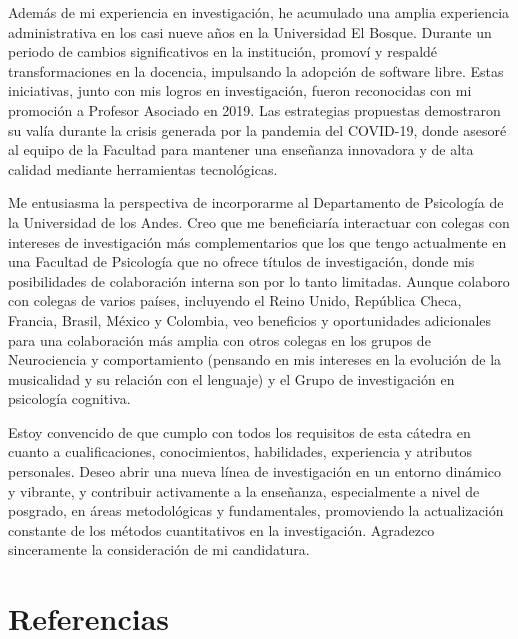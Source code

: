 \documentclass[11pt,a4paper,]{awesome-cv}
\begin{document}
\begin{small}
Además de mi experiencia en investigación, he acumulado una amplia experiencia administrativa en los casi nueve años en la Universidad El Bosque. Durante un periodo de cambios significativos en la institución, promoví y respaldé transformaciones en la docencia, impulsando la adopción de software libre. Estas iniciativas, junto con mis logros en investigación, fueron reconocidas con mi promoción a Profesor Asociado en 2019. Las estrategias propuestas demostraron su valía durante la crisis generada por la pandemia del COVID-19, donde asesoré al equipo de la Facultad para mantener una enseñanza innovadora y de alta calidad mediante herramientas tecnológicas.

Me entusiasma la perspectiva de incorporarme al Departamento de Psicología de la Universidad de los Andes. Creo que me beneficiaría interactuar con colegas con intereses de investigación más complementarios que los que tengo actualmente en una Facultad de Psicología que no ofrece títulos de investigación, donde mis posibilidades de colaboración interna son por lo tanto limitadas. Aunque colaboro con colegas de varios países, incluyendo el Reino Unido, República Checa, Francia, Brasil, México y Colombia, veo beneficios y oportunidades adicionales para una colaboración más amplia con otros colegas en los grupos de Neurociencia y comportamiento (pensando en mis intereses en la evolución de la musicalidad y su relación con el lenguaje) y el Grupo de investigación en psicología cognitiva.

Estoy convencido de que cumplo con todos los requisitos de esta cátedra en cuanto a cualificaciones, conocimientos, habilidades, experiencia y atributos personales. Deseo abrir una nueva línea de investigación en un entorno dinámico y vibrante, y contribuir activamente a la enseñanza, especialmente a nivel de posgrado, en áreas metodológicas y fundamentales, promoviendo la actualización constante de los métodos cuantitativos en la investigación. Agradezco sinceramente la consideración de mi candidatura.

\end{small}

\hypertarget{referencias}{%
\section{Referencias}\label{referencias}}

\singlespacing
\begin{multicols}{2}
\AtNextBibliography{\footnotesize}
\printbibliography[heading=none]
\end{multicols}
\end{document}
